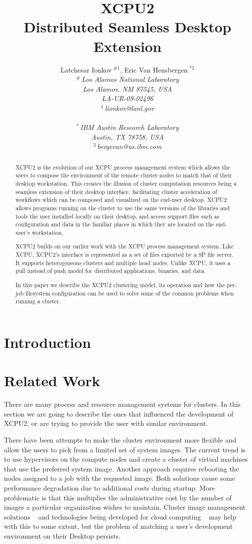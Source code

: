 \documentclass[10pt,conference,letterpaper]{IEEEtran}
\title{XCPU2\\
Distributed Seamless Desktop Extension}
\author{%
{Latchesar Ionkov{\small $~^{\#1}$}, Eric Van Hensbergen{\small $~^{*2}$} }%
\vspace{1.6mm}\\
\fontsize{10}{10}\selectfont\itshape
$^{\#}$\,Los Alamos National Laboratory\\
Los Alamos, NM 87545, USA\\
LA-UR-09-02496\\
\fontsize{9}{9}\selectfont\ttfamily\upshape
$^{1}$\,lionkov@lanl.gov\\
\vspace{1.2mm}\\
\fontsize{10}{10}\selectfont\rmfamily\itshape
$^{*}$\,IBM Austin Research Laboratory\\
Austin, TX 78758, USA\\
\fontsize{9}{9}\selectfont\ttfamily\upshape
$^{2}$\,bergevan@us.ibm.com
}
\begin{document}
\maketitle
%

\begin{abstract}

XCPU2 is the evolution of our XCPU process management system 
which allows the users to compose the environment of the remote
cluster nodes to match that of their desktop workstation.  This
creates the illusion of cluster computation resources being a 
seamless extension of their desktop interface, facilitating 
cluster acceleration of workflows which can be composed and
visualized on the end-user desktop. 
XCPU2 allows programs running on the cluster to use 
the same versions of the libraries and tools the user installed 
locally on their desktop, and access support files such as configuration
and data in the familiar places in which they are located on the
end-user's workstation.

XCPU2 builds on our earlier work with the XCPU process management system. 
Like XCPU, XCPU2's interface is represented as a set of files
exported by a 9P file server. It supports heterogeneous clusters and
multiple head nodes. Unlike XCPU, it uses a pull instead of push model
for distributed applications, binaries, and data.

In this paper we describe the XCPU2 clustering model, its operation
and how the per-job filesystem configuration can be used to solve some
of the common problems when running a cluster.

\end{abstract}

\section{Introduction}



\section{Related Work}

There are many process and resource management systems for clusters. In this
section we are going to describe the ones that influenced the development of
XCPU2, or are trying to provide the user with similar environment.

There have been attempts to make the cluster environment more flexible and allow
the users to pick from a limited set of system images. The current trend
is to use hypervisors on the compute nodes and create a cluster of
virtual machines that use the preferred system image. Another approach
requires rebooting the nodes assigned to a job with the requested image.
Both solutions cause some performance degradation due to additional
costs during startup.  
More problematic is that this multiplies the administrative
cost by the number of images a particular organization wishes to maintain.
Cluster image management solutions ~\cite{blutopia} and technologies
being developed for cloud computing ~\cite{mirage} may help with this to some extent, 
but the problem of matching a user's development environment on their Desktop 
persists.
\end{document}
